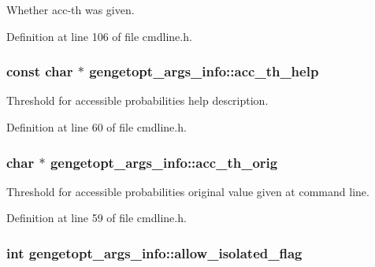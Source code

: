 Whether acc-\/th was given. 



Definition at line 106 of file cmdline.\+h.

\hypertarget{structgengetopt__args__info_a6c25c2ca04d50ecd361603514540046b}{
\subsubsection[{acc\+\_\+th\+\_\+help}]{\setlength{\rightskip}{0pt plus 5cm}const char $\ast$ gengetopt\+\_\+args\+\_\+info\+::acc\+\_\+th\+\_\+help}}\label{structgengetopt__args__info_a6c25c2ca04d50ecd361603514540046b}


Threshold for accessible probabilities help description. 



Definition at line 60 of file cmdline.\+h.

\hypertarget{structgengetopt__args__info_ae8040a2293d3668f9afd87c7cc487591}{
\subsubsection[{acc\+\_\+th\+\_\+orig}]{\setlength{\rightskip}{0pt plus 5cm}char $\ast$ gengetopt\+\_\+args\+\_\+info\+::acc\+\_\+th\+\_\+orig}}\label{structgengetopt__args__info_ae8040a2293d3668f9afd87c7cc487591}


Threshold for accessible probabilities original value given at command line. 



Definition at line 59 of file cmdline.\+h.

\hypertarget{structgengetopt__args__info_a7253dcfc654558789f9bdd5b6e29a3bb}{
\subsubsection[{allow\+\_\+isolated\+\_\+flag}]{\setlength{\rightskip}{0pt plus 5cm}int gengetopt\+\_\+args\+\_\+info\+::allow\+\_\+isolated\+\_\+flag}}\label{structgengetopt__args__info_a7253dcfc654558789f9bdd5b6e29a3bb}


